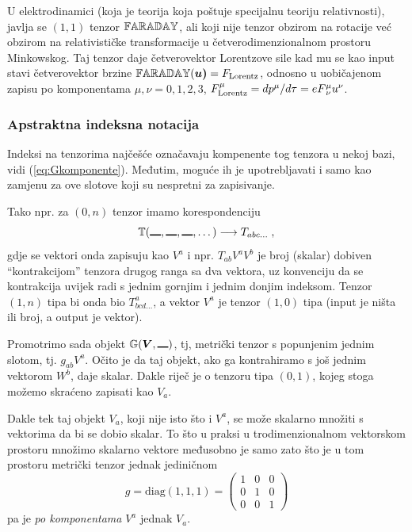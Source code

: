 U elektrodinamici (koja je teorija koja poštuje specijalnu teoriju
relativnosti), javlja se $(1,1)$ tenzor $\mathbb{FARADAY}$, ali koji
nije tenzor obzirom na rotacije
već obzirom na relativističke transformacije u četverodimenzionalnom
prostoru Minkowskog. Taj tenzor daje četverovektor Lorentzove sile
kad mu se kao input stavi četverovektor brzine
$\bbtensor{FARADAY}(\vec{u)} = F_{\rm Lorentz}$, odnosno u uobičajenom
zapisu po komponentama $\mu, \nu = 0,1,2,3$, 
$F^{\mu}_{\rm Lorentz} = d p^{\mu}/d\tau = e F^{\mu}_{\,\nu} u^\nu$.


\subsubsection*{Apstraktna indeksna notacija}

Indeksi na tenzorima najčešće označavaju kompenente tog tenzora
u nekoj bazi, vidi (\ref{eq:Gkomponente}). Međutim, moguće ih
je upotrebljavati i samo kao zamjenu za ove slotove koji su
nespretni za zapisivanje.

Tako npr.  za $(0, n)$ tenzor imamo korespondenciju
\begin{equation}
\bbtensor{T}(\slot,\slot,\slot, \dots)  \longrightarrow T_{abc\dots} \;,
\end{equation}
gdje se vektori onda zapisuju kao $V^a$ i npr.  $T_{ab}V^{a}V^{b}$ je
broj (skalar) dobiven ``kontrakcijom'' tenzora drugog ranga sa
dva vektora, uz konvenciju da se kontrakcija uvijek radi s jednim
gornjim i jednim donjim indeksom. Tenzor $(1,n)$ tipa bi onda bio
$T^{a}_{bcd\dots}$, a vektor $V^a$ je tenzor $(1,0)$ tipa (input
je ništa ili broj, a output je vektor).

Promotrimo sada objekt  $\bbtensor{G}(\vec{V},\slot)$, tj, metrički
tenzor s popunjenim jednim slotom, tj. $g_{ab}V^a$. Očito je da
taj objekt, ako ga kontrahiramo s još jednim vektorom $W^{b}$, daje skalar.
Dakle riječ je o tenzoru tipa $(0, 1)$, kojeg stoga možemo skraćeno
zapisati kao $V_a$.

Dakle tek taj objekt $V_a$, koji nije isto što i $V^a$, se može
skalarno množiti s vektorima da bi se dobio skalar. To što u praksi
u trodimenzionalnom vektorskom prostoru množimo skalarno vektore
međusobno je samo zato što je u tom prostoru metrički tenzor
jednak jediničnom 
\begin{displaymath}
g = \text{diag}(1, 1, 1) =
\begin{pmatrix}
1 & 0 & 0 \\ 0 & 1 & 0 \\ 0 & 0 & 1
\end{pmatrix}
\end{displaymath}
pa je \emph{po komponentama} $V^a$ jednak $V_a$.

